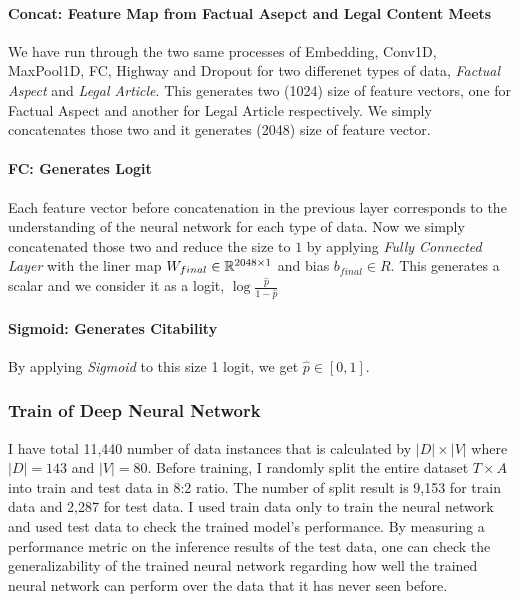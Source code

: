 \documentclass[12pt,letterpaper]{article}
\begin{document}
\paragraph{Concat: Feature Map from Factual Asepct and Legal Content Meets}

We have run through the two same processes of Embedding, Conv1D, MaxPool1D, FC, Highway and Dropout for two differenet types of data, \textit{Factual Aspect} and \textit{Legal Article}.
This generates two (1024) size of feature vectors, one for Factual Aspect and another for Legal Article respectively.
We simply concatenates those two and it generates (2048) size of feature vector.


\paragraph{FC: Generates Logit}
Each feature vector before concatenation in the previous layer corresponds to the understanding of the neural network for each type of data. Now we simply concatenated those two and
reduce the size to $1$ by applying \textit{Fully Connected Layer} with the liner map $W_{final} \in \Bbb R^{2048 \times 1}$ and bias $b_{final} \in R$.
This generates a scalar and we consider it as a logit, $\log{\frac{\hat{p}}{1-\hat{p}}}$

\paragraph{Sigmoid: Generates Citability}
By applying \textit{Sigmoid} to this size 1 logit, we get $\hat{p} \in  [0, 1]$.

\subsubsection{Train of Deep Neural Network}

I have total 11,440 number of data instances that is calculated by $|D| \times |V|$ where $|D| = 143$ and $|V|=80$.
Before training, I randomly split the entire dataset $T \times A$ into train and test data in 8:2 ratio.
The number of split result is 9,153 for train data and 2,287 for test data.
I used train data only to train the neural network and used test data to check the trained model's performance.
By measuring a performance
metric on the inference results of the test data, one can check the generalizability of the trained neural network regarding
how well the trained neural network can perform over the data that it has never seen before.
\end{document}
